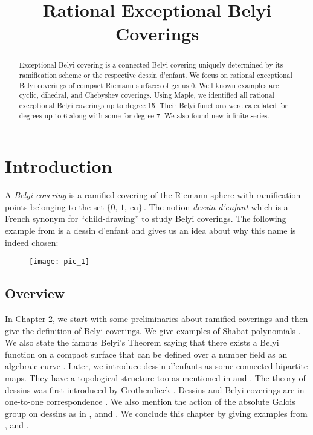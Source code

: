 
\title{Rational Exceptional Belyi Coverings}
\begin{abstract} Exceptional Belyi covering is a connected Belyi covering uniquely determined by its ramification scheme or the respective dessin d’enfant. We focus on rational exceptional Belyi coverings of compact Riemann surfaces of genus 0. Well known examples are cyclic, dihedral, and Chebyshev coverings. Using Maple, we identified all rational exceptional Belyi coverings up to degree 15. Their Belyi functions were calculated for degrees up to 6 along with some for degree 7. We also found new infinite series. 
\end{abstract}
\maketitle

\tableofcontents

\section{Introduction}

A \textit{Belyi covering} is a ramified covering of the Riemann sphere with ramification points belonging to the set $\{0,\,1,\,\infty\}\,.$ The notion \textit{dessin d’enfant} which is a French synonym for ``child-drawing” to study Belyi coverings. The following example from \cite{SinSyd} is a dessin d’enfant and gives us an idea about why this name is indeed chosen:
\begin{figure}[htp]
\texttt{[image: pic\_1]}
\end{figure}

\subsection{Overview}

In Chapter 2, we start with some preliminaries about ramified coverings and then give the definition of Belyi coverings. We give examples of Shabat polynomials \cite{Sha}. We also state the famous Belyi’s Theorem saying that there exists a Belyi function on a compact surface that can be defined over a number field as an algebraic curve \cite{Belyi}. Later, we introduce dessin d'enfants as some connected bipartite maps. They have a topological structure too as mentioned in \cite{GirGon} and \cite{SinSyd}. The theory of dessins was first introduced by Grothendieck \cite{Groth}. Dessins and Belyi coverings are in one-to-one correspondence \cite{Zvo}. We also mention the action of the absolute Galois group on dessins as in \cite{LanZvo}, \cite{GirGon} annd \cite{CouGran}. We conclude this chapter by giving examples from \cite{ShaVoe}, \cite{BetZvo} and \cite{Zvo}.\\

